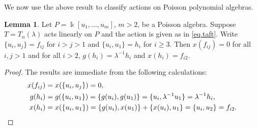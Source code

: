 \documentclass[reqno]{amsart}
\numberwithin{equation}{section}
\theoremstyle{definition}
\newtheorem{lemma}[theorem]{Lemma}
\newcommand\inv{^{-1}}
\newcommand\kk{\Bbbk}
\begin{document}
We now use the above result to classify actions on Poisson polynomial algebras.

\begin{lemma}\label{lem.taft2}
Let $P=\kk[u_1,\hdots,u_m]$, $m>2$, be a Poisson algebra. Suppose $T=T_n(\lambda)$ acts linearly on $P$ and the action is given as in \eqref{eq.taft}. Write $\{u_i,u_j\} = f_{ij}$ for $i>j>1$ and $\{u_i,u_1\}=h_i$ for $i \geq 3$. Then $x(f_{ij})=0$ for all $i,j>1$ and for all $i>2$, $g(h_i)=\lambda\inv h_i$ and $x(h_i)=f_{i2}$.
\end{lemma}
\begin{proof}
The results are immediate from the following calculations:
\begin{align*}
    x(f_{ij}) &= x(\{u_i,u_j\}) = 0, \\
    g(h_i) &= g(\{u_i,u_1\}) = \{g(u_i),g(u_1)\} = \{u_i,\lambda\inv u_1\} = \lambda\inv h_i, \\
    x(h_i) &= x(\{u_i,u_1\}) = \{g(u_i),x(u_1)\} + \{x(u_i),u_1\} = \{u_i,u_2\} = f_{i2}. \qedhere
\end{align*}
\end{proof}
\end{document}
